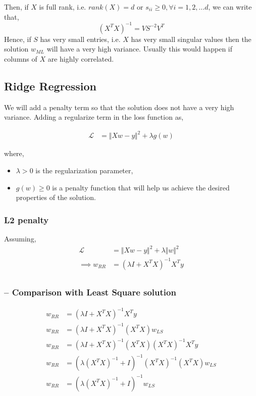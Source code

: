 \documentclass{article}
\begin{document}
Then, if $X$ is full rank, i.e. $rank(X)=d$ or $s_{ii}\geq0, \forall i=1,2,\dots d$, we can write that, $$(X^TX)^{-1}=VS^{-2}V^T$$
Hence, if $S$ has very small entries, i.e. $X$ has very small singular values then the solution $w_{ML}$ will have a very high variance. Usually this would happen if columns of $X$ are highly correlated.

\subsection{Ridge Regression}

We will add a penalty term so that the solution does not have a very high variance. Adding a regularize term in the loss function as,

\begin{align*}
    \mathcal{L} &= \Vert Xw-y \Vert^2 + \lambda g(w)
\end{align*}

where,
\begin{itemize}
    \item $\lambda>0$ is the regularization parameter,
    \item $g(w) \geq 0$ is a penalty function that will help us achieve the desired properties of the solution.
\end{itemize} 

\subsubsection{L2 penalty}

Assuming,
\begin{align*}
    \mathcal{L} &= \Vert Xw-y \Vert^2 + \lambda \Vert w \Vert^2\\
    \implies w_{RR} &= (\lambda I + X^TX)^{-1}X^Ty\\
\end{align*}

\subsubsection{-- Comparison with Least Square solution}

\begin{align*}
    w_{RR} &= (\lambda I + X^TX)^{-1}X^Ty\\
    w_{RR} &= (\lambda I + X^TX)^{-1} (X^TX) w_{LS}\\
    w_{RR} &= (\lambda I + X^TX)^{-1} (X^TX) (X^TX)^{-1}X^Ty\\
    w_{RR} &= (\lambda (X^TX)^{-1} + I)^{-1} (X^TX)^{-1} (X^TX) w_{LS}\\
    w_{RR} &= (\lambda (X^TX)^{-1} + I)^{-1} w_{LS}\\
\end{align*}
\end{document}
